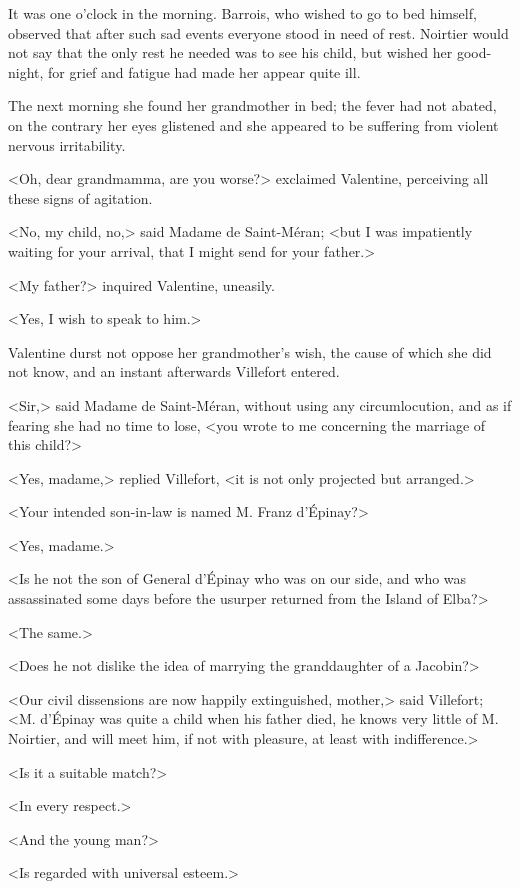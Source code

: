  It was one o'clock in the morning. Barrois, who wished to go to bed himself, observed that after such sad events everyone stood in need of rest. Noirtier would not say that the only rest he needed was to see his child, but wished her good-night, for grief and fatigue had made her appear quite ill. 

 The next morning she found her grandmother in bed; the fever had not abated, on the contrary her eyes glistened and she appeared to be suffering from violent nervous irritability. 

 <Oh, dear grandmamma, are you worse?> exclaimed Valentine, perceiving all these signs of agitation. 

 <No, my child, no,> said Madame de Saint-Méran; <but I was impatiently waiting for your arrival, that I might send for your father.> 

 <My father?> inquired Valentine, uneasily. 

 <Yes, I wish to speak to him.> 

 Valentine durst not oppose her grandmother's wish, the cause of which she did not know, and an instant afterwards Villefort entered. 

 <Sir,> said Madame de Saint-Méran, without using any circumlocution, and as if fearing she had no time to lose, <you wrote to me concerning the marriage of this child?> 

 <Yes, madame,> replied Villefort, <it is not only projected but arranged.> 

 <Your intended son-in-law is named M. Franz d'Épinay?> 

 <Yes, madame.> 

 <Is he not the son of General d'Épinay who was on our side, and who was assassinated some days before the usurper returned from the Island of Elba?> 

 <The same.> 

 <Does he not dislike the idea of marrying the granddaughter of a Jacobin?> 

 <Our civil dissensions are now happily extinguished, mother,> said Villefort; <M. d'Épinay was quite a child when his father died, he knows very little of M. Noirtier, and will meet him, if not with pleasure, at least with indifference.> 

 <Is it a suitable match?> 

 <In every respect.> 

 <And the young man?> 

 <Is regarded with universal esteem.> 

